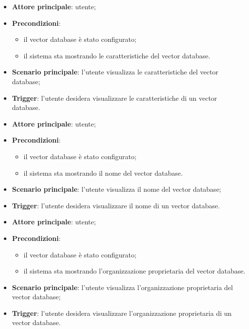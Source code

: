 \documentclass[10pt, a4paper]{article}
\begin{document}
    \begin{itemize}
        \item \textbf{Attore principale}: utente;
        \item \textbf{Precondizioni}:
        \begin{itemize}
            \item il vector database è stato configurato;
            \item il sistema sta mostrando le caratteristiche del vector database.
        \end{itemize}
        \item \textbf{Scenario principale}: l'utente visualizza le caratteristiche del vector database;
        \item \textbf{Trigger}: l’utente desidera visualizzare le caratteristiche di un vector database.
    \end{itemize}

    \begin{itemize}
        \item \textbf{Attore principale}: utente;
        \item \textbf{Precondizioni}:
        \begin{itemize}
            \item il vector database è stato configurato;
            \item il sistema sta mostrando il nome del vector database.
        \end{itemize}
        \item \textbf{Scenario principale}: l'utente visualizza il nome del vector database;
        \item \textbf{Trigger}: l’utente desidera visualizzare il nome di un vector database.
    \end{itemize}

    \begin{itemize}
        \item \textbf{Attore principale}: utente;
        \item \textbf{Precondizioni}:
        \begin{itemize}
            \item il vector database è stato configurato;
            \item il sistema sta mostrando l'organizzazione proprietaria del vector database.
        \end{itemize}
        \item \textbf{Scenario principale}: l'utente visualizza l'organizzazione proprietaria del vector database;
        \item \textbf{Trigger}: l’utente desidera visualizzare l'organizzazione proprietaria di un vector database.
    \end{itemize}
\end{document}
